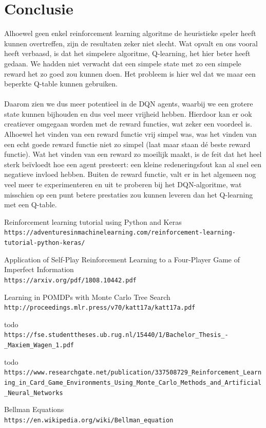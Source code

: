 \documentclass[11pt]{article}
\begin{document}
\section{Conclusie}
Alhoewel geen enkel reinforcement learning algoritme de heuristieke speler heeft kunnen overtreffen, zijn de resultaten zeker niet slecht. Wat opvalt en ons vooral heeft verbaasd, is dat het simpelere algoritme, Q-learning, het hier beter heeft gedaan. We hadden niet verwacht dat een simpele state met zo een simpele reward het zo goed zou kunnen doen. Het probleem is hier wel dat we maar een beperkte Q-table kunnen gebruiken. \\\\
Daarom zien we dus meer potentieel in de DQN agents, waarbij we een grotere state kunnen bijhouden en dus veel meer vrijheid hebben. Hierdoor kan er ook creatiever omgegaan worden met de reward functies, wat zeker een voordeel is. Alhoewel het vinden van een reward functie vrij simpel was, was het vinden van een echt goede reward functie niet zo simpel (laat maar staan dé beste reward functie). Wat het vinden van een reward zo moeilijk maakt, is de feit dat het heel sterk beïvloedt hoe een agent presteert: een kleine redeneringsfout kan al snel een negatieve invloed hebben. Buiten de reward functie, valt er in het algemeen nog veel meer te experimenteren en uit te proberen bij het DQN-algoritme, wat misschien op een punt betere prestaties zou kunnen leveren dan het Q-learning met een Q-table. 
\newpage
\begin{thebibliography}{9}
Reinforcement learning tutorial using Python and Keras 
\\\texttt{https://adventuresinmachinelearning.com/reinforcement-learning-tutorial-python-keras/}

Application of Self-Play Reinforcement Learning to a Four-Player Game of Imperfect Information
\\\texttt{https://arxiv.org/pdf/1808.10442.pdf}

Learning in POMDPs with Monte Carlo Tree Search
\\\texttt{http://proceedings.mlr.press/v70/katt17a/katt17a.pdf}

todo
\\\texttt{https://fse.studenttheses.ub.rug.nl/15440/1/Bachelor\_Thesis\_-\_Maxiem\_Wagen\_1.pdf}

todo
\\\texttt{https://www.researchgate.net/publication/337508729\_Reinforcement\_Learning\_in\_Card\_Game\_Environments\_Using\_Monte\_Carlo\_Methods\_and\_Artificial\_Neural\_Networks}

Bellman Equations
\\\texttt{https://en.wikipedia.org/wiki/Bellman\_equation}
\end{thebibliography}
\newpage
\end{document}
